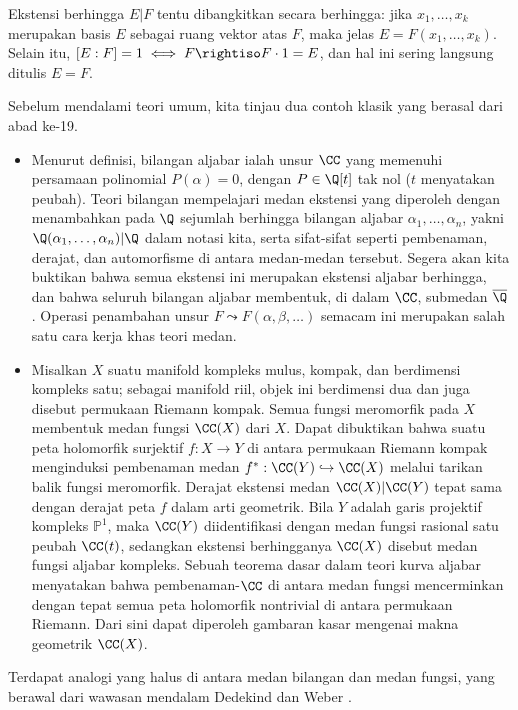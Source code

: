 Ekstensi berhingga $E|F$ tentu dibangkitkan secara berhingga: jika $x_1, \ldots, x_k$ merupakan basis $E$ sebagai ruang vektor atas $F$, maka jelas $E=F(x_1, \ldots, x_k)$. Selain itu, $[E:F]=1 \iff F \rightiso F \cdot 1 = E$, dan hal ini sering langsung ditulis $E=F$.

\begin{example}\label{eg:field-basic-examples}
	Sebelum mendalami teori umum, kita tinjau dua contoh klasik yang berasal dari abad ke-19.
	\begin{itemize}
		\item Menurut definisi, bilangan aljabar ialah unsur $\CC$ yang memenuhi persamaan polinomial $P(\alpha)=0$, dengan $P \in \Q[t]$ tak nol ($t$ menyatakan peubah). Teori bilangan mempelajari medan ekstensi yang diperoleh dengan menambahkan pada $\Q$ sejumlah berhingga bilangan aljabar $\alpha_1, \ldots, \alpha_n$, yakni $\Q(\alpha_1, \ldots, \alpha_n)|\Q$ dalam notasi kita, serta sifat-sifat seperti pembenaman, derajat, dan automorfisme di antara medan-medan tersebut. Segera akan kita buktikan bahwa semua ekstensi ini merupakan ekstensi aljabar berhingga, dan bahwa seluruh bilangan aljabar membentuk, di dalam $\CC$, submedan $\overline{\Q}$. Operasi penambahan unsur $F \leadsto F(\alpha, \beta, \ldots)$ semacam ini merupakan salah satu cara kerja khas teori medan.
		\item Misalkan $X$ suatu manifold kompleks mulus, kompak, dan berdimensi kompleks satu; sebagai manifold riil, objek ini berdimensi dua dan juga disebut permukaan Riemann kompak. Semua fungsi meromorfik pada $X$ membentuk medan fungsi $\CC(X)$ dari $X$. Dapat dibuktikan bahwa suatu peta holomorfik surjektif $f: X \to Y$ di antara permukaan Riemann kompak menginduksi pembenaman medan $f^*: \CC(Y) \hookrightarrow \CC(X)$ melalui tarikan balik fungsi meromorfik. Derajat ekstensi medan $\CC(X)|\CC(Y)$ tepat sama dengan derajat peta $f$ dalam arti geometrik. Bila $Y$ adalah garis projektif kompleks $\mathbb{P}^1$, maka $\CC(Y)$ diidentifikasi dengan medan fungsi rasional satu peubah $\CC(t)$, sedangkan ekstensi berhingganya $\CC(X)$ disebut medan fungsi aljabar kompleks. Sebuah teorema dasar dalam teori kurva aljabar menyatakan bahwa pembenaman-$\CC$ di antara medan fungsi mencerminkan dengan tepat semua peta holomorfik nontrivial di antara permukaan Riemann. Dari sini dapat diperoleh gambaran kasar mengenai makna geometrik $\CC(X)$.
	\end{itemize}
	Terdapat analogi yang halus di antara medan bilangan dan medan fungsi, yang berawal dari wawasan mendalam Dedekind dan Weber \cite{DW82}.
\end{example}

